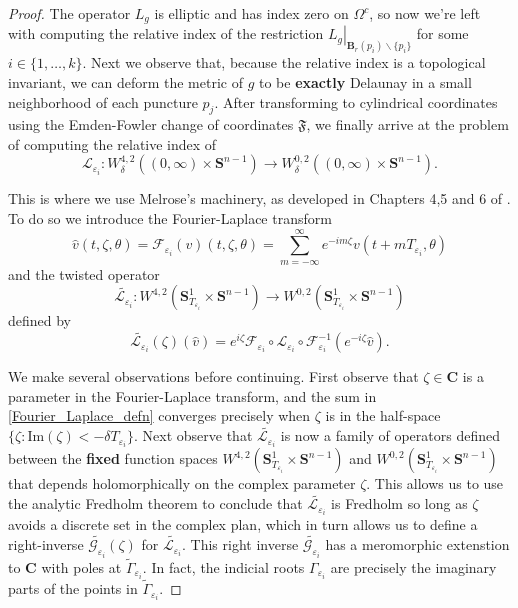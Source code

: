 \documentclass[reqno,11pt]{amsart}
\theoremstyle{tttheorem}
\newcommand{\Ss}{\mathbf{S}}
\begin{document}
\begin{proof}
The operator $L_g$ is elliptic and has index zero on $\Omega^c$, 
so now we're left with computing the relative index of the restriction 
$\left. L_g \right |_{\mathbf{B}_r(p_i) \backslash \{ p_i\} }$ for 
some $i \in \{ 1, \dots, k\}$. Next we observe that, because the relative index is a topological 
invariant, we can deform the metric of $g$ to be {\bf exactly} 
Delaunay in a small neighborhood of each puncture $p_j$. After transforming 
to cylindrical coordinates using the Emden-Fowler change of coordinates $\mathfrak{F}$, 
we finally arrive at the problem of computing the relative index of 
$$\mathcal{L}_{\varepsilon_i} : W^{4,2}_\delta ((0,\infty) \times\Ss^{n-1}) \rightarrow 
W^{0,2}_\delta ((0,\infty) \times \Ss^{n-1}).$$

This is where we use Melrose's machinery, as developed in Chapters 4,5 and 6 
of \cite{Mel}. To do so we introduce the Fourier-Laplace transform 
\begin{equation} \label{Fourier_Laplace_defn}
\widehat{v} (t,\zeta,\theta) = \mathcal{F}_{\varepsilon_i} (v)(t,\zeta,\theta) 
= \sum_{m=-\infty}^\infty e^{-im\zeta} v(t+mT_{\varepsilon_i},\theta)\end{equation}
and the twisted operator 
$$\widetilde{\mathcal{L}_{\varepsilon_i}} : W^{4,2}(\Ss^1_{T_{\varepsilon_i}} \times 
\Ss^{n-1}) \rightarrow W^{0,2}(\Ss^1_{T_{\varepsilon_i}} \times \Ss^{n-1})$$
defined by 
\begin{equation} \label{twisted_op_defn} 
\widetilde{\mathcal{L}_{\varepsilon_i}} (\zeta)(\widehat v) = e^{i\zeta} 
\mathcal{F}_{\varepsilon_i} \circ \mathcal{L}_{\varepsilon_i} \circ 
\mathcal{F}_{\varepsilon_i}^{-1} (e^{-i\zeta} \widehat v).\end{equation}

We make several observations before continuing. First observe that 
$\zeta \in \mathbf{C}$ is a parameter in the Fourier-Laplace transform, 
and the sum in \eqref{Fourier_Laplace_defn} converges precisely when $\zeta$ is in 
the half-space $\{ \zeta : \mathrm{Im} (\zeta) < -\delta T_{\varepsilon_i}\}$. Next 
observe that $\widetilde {\mathcal{L}_{\varepsilon_i}}$ is now a family 
of operators defined between the {\bf fixed} function spaces $W^{4,2}(\Ss^1_{T_{\varepsilon_i}}
\times \Ss^{n-1})$ and $W^{0,2}(\Ss^1_{T_{\varepsilon_i}} \times \Ss^{n-1})$
that depends holomorphically on the complex parameter $\zeta$. This 
allows us to use the analytic Fredholm theorem to conclude that 
$\widetilde{\mathcal{L}_{\varepsilon_i}}$ is Fredholm so long as 
$\zeta$ avoids a discrete set in the complex plan, which in turn 
allows us to define a right-inverse $\widetilde{\mathcal{G}_{\varepsilon_i}}(\zeta)$ 
for $\widetilde{\mathcal{L}_{\varepsilon_i}}$. This right inverse 
$\widetilde{\mathcal{G}_{\varepsilon_i}}$ has a meromorphic extenstion 
to $\mathbf{C}$ with poles at $\widetilde \Gamma_{\varepsilon_i}$. 
In fact, the indicial 
roots $\Gamma_{\varepsilon_i}$ are precisely the imaginary parts of the points 
in $\widetilde \Gamma_{\varepsilon_i}$. 


\end{proof}
\end{document}

